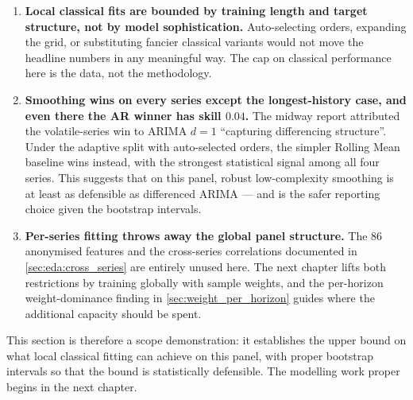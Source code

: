 \begin{enumerate}
  \item \textbf{Local classical fits are bounded by training length and target structure, not by model sophistication.} Auto-selecting orders, expanding the grid, or substituting fancier classical variants would not move the headline numbers in any meaningful way. The cap on classical performance here is the data, not the methodology.
  \item \textbf{Smoothing wins on every series except the longest-history case, and even there the AR winner has skill $0.04$.} The midway report attributed the volatile-series win to ARIMA $d{=}1$ ``capturing differencing structure''. Under the adaptive split with auto-selected orders, the simpler Rolling Mean baseline wins instead, with the strongest statistical signal among all four series. This suggests that on this panel, robust low-complexity smoothing is at least as defensible as differenced ARIMA --- and is the safer reporting choice given the bootstrap intervals.
  \item \textbf{Per-series fitting throws away the global panel structure.} The 86 anonymised features and the cross-series correlations documented in \cref{sec:eda:cross_series} are entirely unused here. The next chapter lifts both restrictions by training globally with sample weights, and the per-horizon weight-dominance finding in \cref{sec:weight_per_horizon} guides where the additional capacity should be spent.
\end{enumerate}

This section is therefore a scope demonstration: it establishes the upper bound on what local classical fitting can achieve on this panel, with proper bootstrap intervals so that the bound is statistically defensible. The modelling work proper begins in the next chapter.
